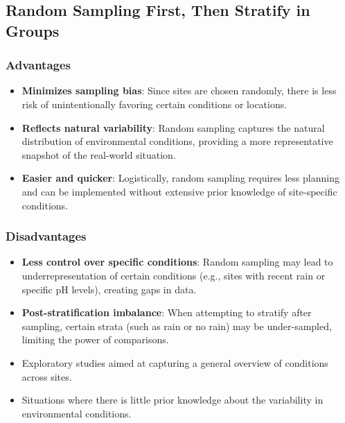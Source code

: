 \documentclass{article}
\begin{document}
	\subsection{Random Sampling First, Then Stratify in Groups}
\begin{multicols}{2}
	\subsubsection*{Advantages}
	\begin{itemize}
		\item \textbf{Minimizes sampling bias}: Since sites are chosen randomly, there is less risk of unintentionally favoring certain conditions or locations.
		\item \textbf{Reflects natural variability}: Random sampling captures the natural distribution of environmental conditions, providing a more representative snapshot of the real-world situation.
		\item \textbf{Easier and quicker}: Logistically, random sampling requires less planning and can be implemented without extensive prior knowledge of site-specific conditions.
	\end{itemize}
	\columnbreak
	\subsubsection*{Disadvantages}
	\begin{itemize}
		\item \textbf{Less control over specific conditions}: Random sampling may lead to underrepresentation of certain conditions (e.g., sites with recent rain or specific pH levels), creating gaps in data.
		\item \textbf{Post-stratification imbalance}: When attempting to stratify after sampling, certain strata (such as rain or no rain) may be under-sampled, limiting the power of comparisons.
	\end{itemize}
\end{multicols}	
	
\begin{tcolorbox}[title=Complete Randomization is best for \dotfill]
	\begin{itemize}
		\item Exploratory studies aimed at capturing a general overview of conditions across sites.
		\item Situations where there is little prior knowledge about the variability in environmental conditions.
	\end{itemize}
\end{tcolorbox}	
\newpage
\end{document}
